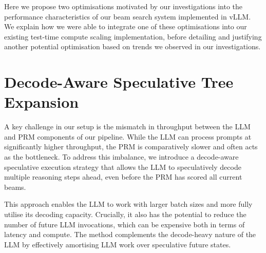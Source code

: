 \documentclass[11pt,twoside]{report}
\begin{document}

Here we propose two optimisations motivated by our investigations into the performance characteristics of our beam search system implemented in vLLM.
We explain how we were able to integrate one of these optimisations into our existing test-time compute scaling implementation, before detailing and justifying another potential optimisation based on trends we observed in our investigations.  

\section{Decode-Aware Speculative Tree Expansion}
A key challenge in our setup is the mismatch in throughput between the LLM and PRM components of our pipeline. 
While the LLM can process prompts at significantly higher throughput, the PRM is comparatively slower and often acts as the bottleneck. 
To address this imbalance, we introduce a decode-aware speculative execution strategy that allows the LLM to speculatively decode multiple reasoning steps ahead, even before the PRM has scored all current beams.

This approach enables the LLM to work with larger batch sizes and more fully utilise its decoding capacity. 
Crucially, it also has the potential to reduce the number of future LLM invocations, which can be expensive both in terms of latency and compute. 
The method complements the decode-heavy nature of the LLM by effectively amortising LLM work over speculative future states.
\end{document}

